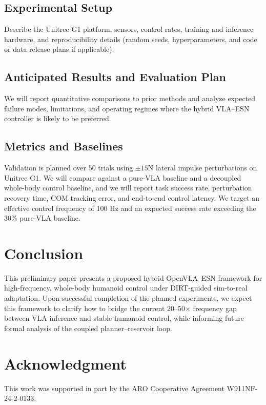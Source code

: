 \documentclass[conference]{IEEEtran}
\begin{document}
\subsection{Experimental Setup}
Describe the Unitree G1 platform, sensors, control rates, training and inference hardware, and reproducibility details (random seeds, hyperparameters, and code or data release plans if applicable).

\subsection{Anticipated Results and Evaluation Plan}
We will report quantitative comparisons to prior methods and analyze expected failure modes, limitations, and operating regimes where the hybrid VLA--ESN controller is likely to be preferred.

\subsection{Metrics and Baselines}
Validation is planned over 50 trials using $\pm 15$N lateral impulse perturbations on Unitree G1. We will compare against a pure-VLA baseline and a decoupled whole-body control baseline, and we will report task success rate, perturbation recovery time, COM tracking error, and end-to-end control latency. We target an effective control frequency of 100 Hz and an expected success rate exceeding the 30\% pure-VLA baseline.

\section{Conclusion}
This preliminary paper presents a proposed hybrid OpenVLA--ESN framework for high-frequency, whole-body humanoid control under DIRT-guided sim-to-real adaptation. Upon successful completion of the planned experiments, we expect this framework to clarify how to bridge the current 20--50$\times$ frequency gap between VLA inference and stable humanoid control, while informing future formal analysis of the coupled planner--reservoir loop.

\section*{Acknowledgment}
This work was supported in part by the ARO Cooperative Agreement W911NF-24-2-0133.



\end{document}
